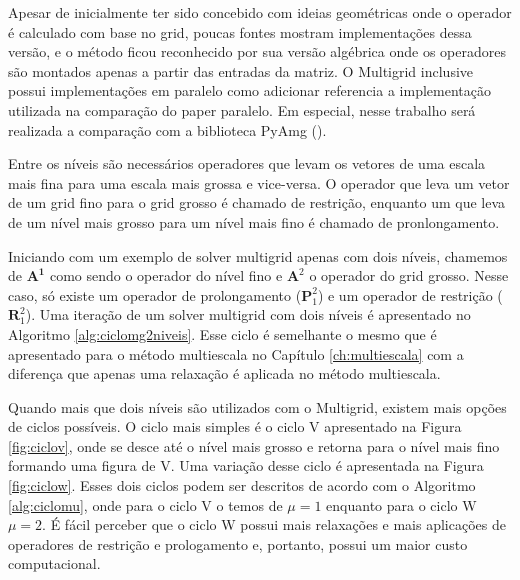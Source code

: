 Apesar de inicialmente ter sido concebido com ideias geométricas onde o operador é calculado com base no grid, poucas fontes mostram implementações dessa versão, e o método ficou reconhecido por sua versão algébrica onde os operadores são montados apenas a partir das entradas da matriz. O Multigrid inclusive possui implementações em paralelo como {\color{red} adicionar referencia a implementação utilizada na comparação do paper paralelo}.  Em especial, nesse trabalho será realizada a comparação com a biblioteca PyAmg (\citet{OlSc2018}).


Entre os níveis são necessários operadores que levam os vetores de uma escala mais fina para uma escala mais grossa e vice-versa. O operador que leva um vetor de um grid fino para o grid grosso é chamado de restrição, enquanto um que leva de um nível mais grosso para um nível mais fino é chamado de pronlongamento. 


Iniciando com um exemplo de solver multigrid apenas com dois níveis, chamemos de $\mathbf{A^1}$ como sendo o operador do nível fino e $\mathbf{A}^2$ o operador do grid grosso. Nesse caso, só existe um operador de prolongamento ($\mathbf{P}_1^2$) e um operador de restrição ($\mathbf{R}^2_1$). Uma iteração de um solver multigrid com dois níveis é apresentado no Algoritmo \ref{alg:ciclomg2niveis}. Esse ciclo é semelhante o mesmo que é apresentado para o método multiescala no Capítulo \ref{ch:multiescala} com a diferença que apenas uma relaxação é aplicada no método multiescala.


Quando mais que dois níveis são utilizados com o Multigrid, existem mais opções de ciclos possíveis. O ciclo mais simples é o ciclo V apresentado na Figura \ref{fig:ciclov}, onde se desce até o nível mais grosso e retorna para o nível mais fino formando uma figura de V. Uma variação desse ciclo é apresentada na Figura \ref{fig:ciclow}. Esses dois ciclos podem ser descritos de acordo com o Algoritmo \ref{alg:ciclomu}, onde para o ciclo V o temos de $\mu = 1$ enquanto para o ciclo W $\mu = 2$. É fácil perceber que o ciclo W possui mais relaxações e mais aplicações de operadores de restrição e prologamento e, portanto, possui um maior custo computacional.

